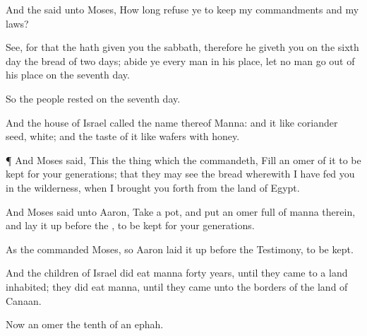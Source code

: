 {And the
{}
said unto
Moses, How long
refuse ye to
keep my
commandments and my
laws?

See, for that the
{} hath
given you the
sabbath, therefore he
giveth you on the
sixth
day the
bread of two
days;
abide ye every
man in his place, let no
man go
out of his
place on the
seventh
day.

So the
people
rested on the
seventh
day.

And the
house of
Israel
called the
name thereof
Manna: and it
{} like
coriander
seed,
white; and the
taste of it
{} like
wafers
{} with
honey.


\par }{\PP {}¶ And
Moses
said, This
{} the
thing which the
{}
commandeth,
Fill an
omer of it to be
kept for your
generations; that they may
see the
bread wherewith I have
fed you in the
wilderness, when I brought you
forth from the
land of
Egypt.

And
Moses
said unto
Aaron,
Take
a
pot, and
put an
omer
full of
manna therein, and lay it
up
before the
{}, to be
kept for your
generations.

As the
{}
commanded
Moses, so
Aaron laid it
up
before the
Testimony, to be
kept.

And the
children of
Israel did
eat
manna
forty
years, until they
came to a
land
inhabited; they did
eat
manna, until they
came unto the
borders of the
land of
Canaan.

Now an
omer
{} the
tenth
{} of an
ephah.




\par }
